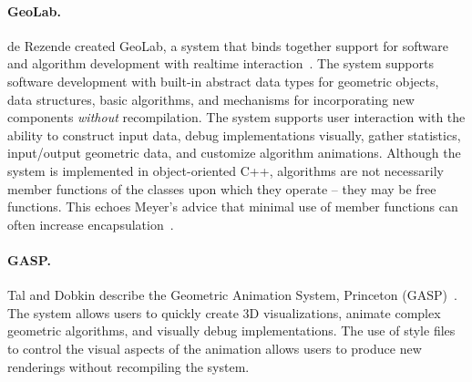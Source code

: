 \paragraph{GeoLab.}

de Rezende created GeoLab, a system that binds together support for software and
algorithm development with realtime interaction~\cite{de1993geolab,
de1993animation}. The system supports software development with built-in
abstract data types for geometric objects, data structures, basic algorithms,
and mechanisms for incorporating new components \emph{without} recompilation.
The system supports user interaction with the ability to construct input data,
debug implementations visually, gather statistics, input/output geometric data,
and customize algorithm animations. Although the system is implemented in
object-oriented C++, algorithms are not necessarily member functions of the
classes upon which they operate -- they may be free functions. This echoes
Meyer's advice that minimal use of member functions can often increase
encapsulation~\cite{meyers2005effective}.



\paragraph{GASP.}

Tal and Dobkin describe the Geometric Animation System, Princeton
(GASP)~\cite{tal1995visualization}. The system allows users to quickly create 3D
visualizations, animate complex geometric algorithms, and visually debug
implementations. The use of style files to control the visual aspects of the
animation allows users to produce new renderings without recompiling the system.

